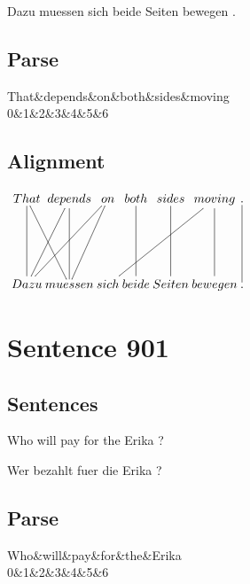 \documentclass{report}
\begin{document}
\noindent Dazu muessen sich beide Seiten bewegen .



\subsection*{Parse}
\begin{dependency}[theme=simple]
\begin{deptext}[column sep=.5cm, row sep=.1ex]
That\&depends\&on\&both\&sides\&moving\\
0\&1\&2\&3\&4\&5\&6\\
\end{deptext}
\end{dependency}


\subsection*{Alignment}
\scriptsize{
$
\xymatrix@C-2.3pc{
That \ar @{-} [ddr] \ar @{-} [dd] & depends \ar @{-} [ddl] \ar @{-} [dd] & on \ar @{-} [ddl] \ar @{-} [ddll] & both \ar @{-} [dd] & sides \ar @{-} [dd] & moving \ar @{-} [ddlll] \ar @{-} [dd] & . \ar @{-} [dd]\\\\
Dazu & muessen & sich & beide & Seiten & bewegen & .
}$}
\newpage\section*{Sentence 901}

\subsection*{Sentences}
Who will pay for the Erika ?

\noindent Wer bezahlt fuer die Erika ?



\subsection*{Parse}
\begin{dependency}[theme=simple]
\begin{deptext}[column sep=.5cm, row sep=.1ex]
Who\&will\&pay\&for\&the\&Erika\\
0\&1\&2\&3\&4\&5\&6\\
\end{deptext}
\end{dependency}
\end{document}
